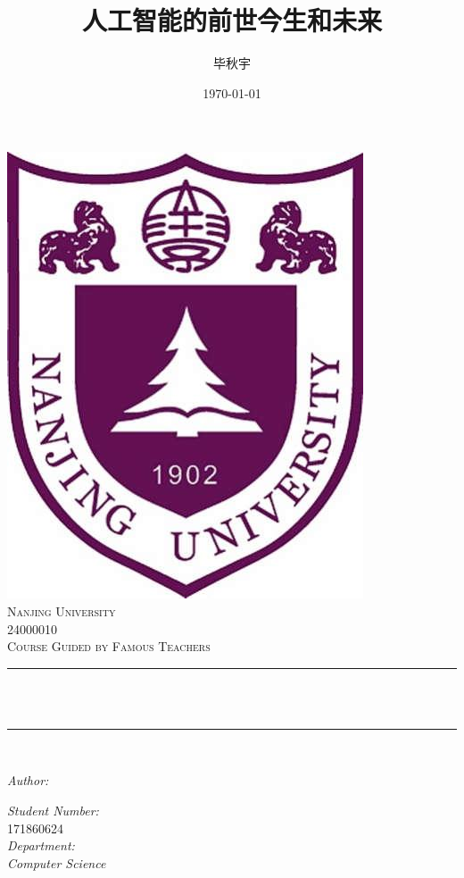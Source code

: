 \documentclass[12pt]{ctexart}
\title{人工智能的前世今生和未来}								%
\author{毕秋宇}								%
\date{\today}											%
\makeatletter
\let\thetitle\@title
\let\theauthor\@author
\let\thedate\@date
\makeatother
\begin{document}

\begin{titlepage}
	\centering
    \vspace*{0.5 cm}
    \includegraphics[scale = 0.2]{NJU.jpg}\\[1.0 cm]	%
    \textsc{\LARGE Nanjing University}\\[2.0 cm]	%
    \textsc{\large 24000010}\\[0.5 cm]				%
	\textsc{\large Course Guided by Famous Teachers}\\[0.5 cm]				%
	\rule{\linewidth}{0.2 mm} \\[0.4 cm]
    {\huge \bfseries \thetitle}\\
	\rule{\linewidth}{0.2 mm} \\[1.5 cm]
	
	\begin{minipage}{0.4\textwidth}
		\begin{flushleft} \large
			\emph{Author:}\\
			\theauthor
			\end{flushleft}
			\end{minipage}
			\begin{minipage}{0.4\textwidth}
			\begin{flushright} \large
                \emph{Student Number:} \\
			171860624\\									%
                \emph{Department:} \\
                \emph{Computer Science}
		\end{flushright}
	\end{minipage}\\[2 cm]
	
	{\large \thedate}\\[2 cm]
 
	\vfill
	
\end{titlepage}
\end{document}
